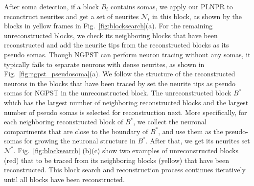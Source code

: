 %
After soma detection, if a block $B_{i}$ contains somas, we apply our PLNPR to reconctruct neurites and get a set of neurites $\mathcal{N}_{i}$ in this block, as shown by the blocks in yellow frames in Fig.~\ref{fig:blocksearch}(a).
%
For the remaining unreconstructed blocks, we check its neighboring blocks that have been reconstructed and add the neurite tips from the reconstructed blocks as its pseudo somas. 
%
Though NGPST can perform neuron tracing without any somas, it typically fails to separate neurons with dense neurites, as shown in Fig.~\ref{fig:ngpst_pseudosoma}(a).
%
We follow the structure of the reconstructed neurons in the blocks that have been traced by set the neurite tips as pseudo somas for NGPST in the unreconstructed block.
%
The unreconstructed block $B^*$ which has the largest number of neighboring reconstructed blocks and the largest number of pseudo somas is selected for reconstruction next.
%
More specifically, for each neighboring reconstructed block of $ B^*$, we collect the neuronal compartments that are close to the boundary of $ B^* $, and use them as the pseudo-somas for growing the neuronal structure in $B^*$.
After that, we get its neurites set $ \mathcal{N}^* $.
Fig.~\ref{fig:blocksearch} (b)(c) show two examples of unreconstructed blocks (red) that to be traced from its neighboring blocks (yellow) that have been reconstructed. 
%
This block search and reconstruction process continues iteratively until all blocks have been reconstructed.
%




